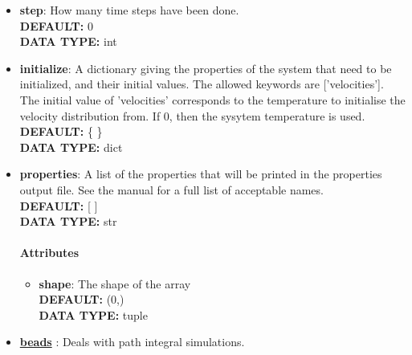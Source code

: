 \begin{itemize}
\item {\bf step}:
 How many time steps have been done.
{\\ \bf DEFAULT: }0
{\\ \bf DATA TYPE: }int
\item {\bf initialize}:
 A dictionary giving the properties of the system that need to be initialized, and their initial values. The allowed keywords are ['velocities']. The initial value of 'velocities' corresponds to the temperature to initialise the velocity distribution from. If 0, then the sysytem temperature is used.
{\\ \bf DEFAULT: }\{ \}
{\\ \bf DATA TYPE: }dict
\item {\bf properties}:
 A list of the properties that will be printed in the properties output file. See the manual for a full list of acceptable names.
{\\ \bf DEFAULT: }[ ]
{\\ \bf DATA TYPE: }str
\paragraph{Attributes}
 \begin{itemize}
\item {\bf shape}:
 The shape of the array
{\\ \bf DEFAULT: }(0,)
{\\ \bf DATA TYPE: }tuple
\end{itemize}
 
\item {\bf \hyperref[BEADS]{beads} }:
 Deals with path integral simulations.

\end{itemize}

